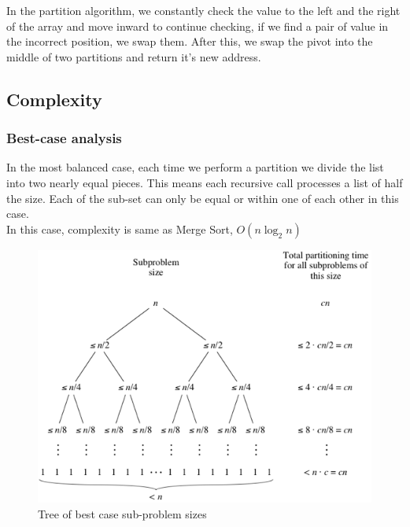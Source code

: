 \documentclass[a4paper]{article}
\begin{document}
In the partition algorithm, we constantly check the value to the left and the right of the array and move inward to continue checking, if we find a pair of value in the incorrect position, we swap them. After this, we swap the pivot into the middle of two partitions and return it's new address.
\subsection{Complexity}
\subsubsection{Best-case analysis}
In the most balanced case, each time we perform a partition we divide the list into two nearly equal pieces. This means each recursive call processes a list of half the size. Each of the sub-set can only be equal or within one of each other in this case.\\
In this case, complexity is same as Merge Sort, $O(n\log_2{n})$
\begin{center}
    \begin{figure}[H]
    \begin{center}
     \includegraphics[scale=1.2]{Quick_best}
    \end{center}
    \caption{Tree of best case sub-problem sizes}
    \label{ref0}
    \end{figure}
\end{center}
\end{document}
